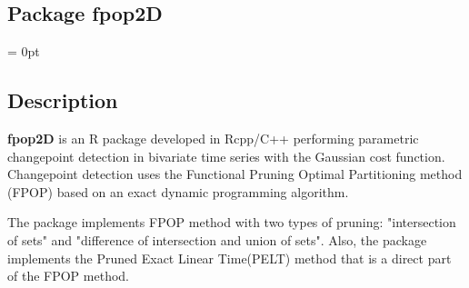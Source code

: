 \documentclass{report}
\begin{document}
	\begin{center} \section*{Package fpop2D}\end{center}

	\parindent = 0pt
	\subsection*{Description}
	
	{\bfseries fpop2D} is an R package developed in Rcpp/C++ performing parametric changepoint detection in bivariate time series with  the Gaussian cost function. Changepoint detection uses the Functional Pruning Optimal Partitioning method (FPOP) based on an exact dynamic programming algorithm.
	
	The package implements FPOP method with two types of pruning: "intersection of sets" and "difference of intersection and union of sets". Also, the package implements the Pruned Exact Linear Time(PELT) method that is a direct part of the FPOP method.
	
\end{document}
